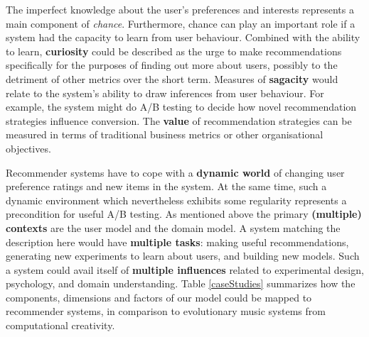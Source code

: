 The imperfect knowledge about the user's preferences and interests represents a main component of \emph{chance}. Furthermore, chance can play an important role if a system had the capacity to learn from user behaviour. Combined with the ability to learn, \textbf{curiosity} could be described as the urge to make recommendations specifically for the purposes of finding out more about users, possibly to the detriment of other metrics over the short term. Measures of \textbf{sagacity} would relate to the system's ability to draw inferences from user behaviour.  For example, the system might do A/B testing to decide how novel recommendation strategies influence conversion.  The \textbf{value} of recommendation strategies can be measured in terms of traditional business metrics or other organisational objectives.

Recommender systems have to cope with a \textbf{dynamic world} of changing user preference ratings and new items in the system. At the same time, such a dynamic environment which nevertheless exhibits some regularity represents a precondition for useful A/B testing.  As mentioned above the primary \textbf{(multiple) contexts} are the user model and the domain model. A system matching the description here would have \textbf{multiple tasks}: making useful recommendations, generating new experiments to learn about users, and building new models. Such a system could avail itself of \textbf{multiple influences} related to
experimental design, psychology, and domain understanding. Table \ref{caseStudies} summarizes how the components, dimensions and factors of our model could be mapped to recommender systems, in comparison to evolutionary music systems from computational creativity.





